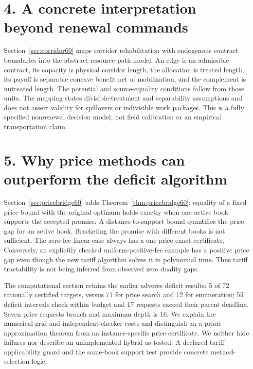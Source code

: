 \documentclass[11pt,letterpaper]{article}
\theoremstyle{definition}\newtheorem{remark}[theorem]{Remark}
\begin{document}
\section*{4. A concrete interpretation beyond renewal commands}
Section~\ref{sec:corridor60} maps corridor rehabilitation with endogenous contract boundaries into the abstract resource-path model. An edge is an admissible contract, its capacity is physical corridor length, the allocation is treated length, its payoff is separable concave benefit net of mobilization, and the complement is untreated length. The potential and source-equality conditions follow from those units. The mapping states divisible-treatment and separability assumptions and does not assert validity for spillovers or indivisible work packages. This is a fully specified nonrenewal decision model, not field calibration or an empirical transportation claim.

\section*{5. Why price methods can outperform the deficit algorithm}
Section~\ref{sec:pricebridge60} adds Theorem~\ref{thm:pricebridge60}: equality of a fixed price bound with the original optimum holds exactly when one active book supports the accepted promise. A distance-to-support bound quantifies the price gap for an active book. Bracketing the promise with different books is not sufficient. The zero-fee linear case always has a one-price exact certificate. Conversely, an explicitly checked uniform-positive-fee example has a positive price gap even though the new tariff algorithm solves it in polynomial time. Thus tariff tractability is not being inferred from observed zero duality gaps.

The computational section retains the earlier adverse deficit results: 5 of 72 rationally certified targets, versus 71 for price search and 12 for enumeration; 55 deficit intervals check within budget and 17 requests exceed their parent deadline. Seven price requests branch and maximum depth is 16. We explain the numerical-grid and independent-checker costs and distinguish an a priori approximation theorem from an instance-specific price certificate. We neither hide failures nor describe an unimplemented hybrid as tested. A declared tariff applicability guard and the same-book support test provide concrete method-selection logic.
\end{document}
